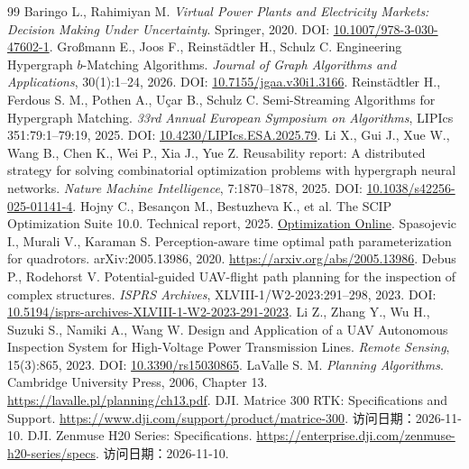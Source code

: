 \begin{thebibliography}{99}
 Baringo L., Rahimiyan M. \emph{Virtual Power Plants and Electricity Markets: Decision Making Under Uncertainty}. Springer, 2020. DOI: \href{https://doi.org/10.1007/978-3-030-47602-1}{10.1007/978-3-030-47602-1}.
 Großmann E., Joos F., Reinstädtler H., Schulz C. Engineering Hypergraph $b$-Matching Algorithms. \emph{Journal of Graph Algorithms and Applications}, 30(1):1--24, 2026. DOI: \href{https://doi.org/10.7155/jgaa.v30i1.3166}{10.7155/jgaa.v30i1.3166}.
 Reinstädtler H., Ferdous S. M., Pothen A., Uçar B., Schulz C. Semi-Streaming Algorithms for Hypergraph Matching. \emph{33rd Annual European Symposium on Algorithms}, LIPIcs 351:79:1--79:19, 2025. DOI: \href{https://doi.org/10.4230/LIPIcs.ESA.2025.79}{10.4230/LIPIcs.ESA.2025.79}.
 Li X., Gui J., Xue W., Wang B., Chen K., Wei P., Xia J., Yue Z. Reusability report: A distributed strategy for solving combinatorial optimization problems with hypergraph neural networks. \emph{Nature Machine Intelligence}, 7:1870--1878, 2025. DOI: \href{https://doi.org/10.1038/s42256-025-01141-4}{10.1038/s42256-025-01141-4}.
 Hojny C., Besançon M., Bestuzheva K., et al. The SCIP Optimization Suite 10.0. Technical report, 2025. \href{https://optimization-online.org/2025/11/the-scip-optimization-suite-10-0/}{Optimization Online}.
 Spasojevic I., Murali V., Karaman S. Perception-aware time optimal path parameterization for quadrotors. arXiv:2005.13986, 2020. \url{https://arxiv.org/abs/2005.13986}.
 Debus P., Rodehorst V. Potential-guided UAV-flight path planning for the inspection of complex structures. \emph{ISPRS Archives}, XLVIII-1/W2-2023:291--298, 2023. DOI: \href{https://doi.org/10.5194/isprs-archives-XLVIII-1-W2-2023-291-2023}{10.5194/isprs-archives-XLVIII-1-W2-2023-291-2023}.
 Li Z., Zhang Y., Wu H., Suzuki S., Namiki A., Wang W. Design and Application of a UAV Autonomous Inspection System for High-Voltage Power Transmission Lines. \emph{Remote Sensing}, 15(3):865, 2023. DOI: \href{https://doi.org/10.3390/rs15030865}{10.3390/rs15030865}.
 LaValle S. M. \emph{Planning Algorithms}. Cambridge University Press, 2006, Chapter 13. \url{https://lavalle.pl/planning/ch13.pdf}.
 DJI. Matrice 300 RTK: Specifications and Support. \url{https://www.dji.com/support/product/matrice-300}. 访问日期：2026-11-10.
 DJI. Zenmuse H20 Series: Specifications. \url{https://enterprise.dji.com/zenmuse-h20-series/specs}. 访问日期：2026-11-10.

\end{thebibliography}
